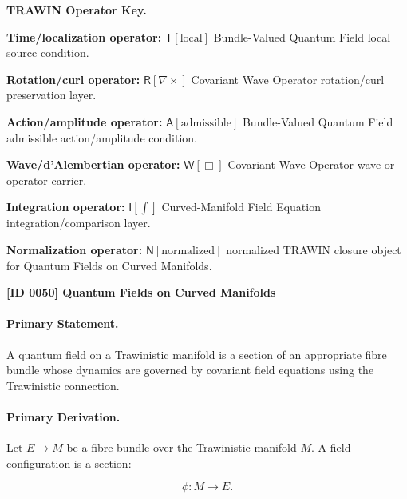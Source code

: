 \par\vspace{0.45\baselineskip}
\noindent\begin{minipage}[t]{\linewidth}
\begingroup
\small
\raggedright
\textbf{TRAWIN Operator Key.}\par
\noindent\textbf{Time/localization operator:} $\mathsf{T}\!\left[\mathrm{local}\right]$ Bundle-Valued Quantum Field local source condition.\par
\noindent\textbf{Rotation/curl operator:} $\mathsf{R}\!\left[\nabla\times\right]$ Covariant Wave Operator rotation/curl preservation layer.\par
\noindent\textbf{Action/amplitude operator:} $\mathsf{A}\!\left[\mathrm{admissible}\right]$ Bundle-Valued Quantum Field admissible action/amplitude condition.\par
\noindent\textbf{Wave/d'Alembertian operator:} $\mathsf{W}\!\left[\Box\right]$ Covariant Wave Operator wave or operator carrier.\par
\noindent\textbf{Integration operator:} $\mathsf{I}\!\left[\int\right]$ Curved-Manifold Field Equation integration/comparison layer.\par
\noindent\textbf{Normalization operator:} $\mathsf{N}\!\left[\mathrm{normalized}\right]$ normalized TRAWIN closure object for Quantum Fields on Curved Manifolds.\par
\endgroup
\end{minipage}

\clearpage
\noindent\textbf{[ID 0050] Quantum Fields on Curved Manifolds}\par
\vspace{0.35em}
\paragraph{Primary Statement.}
A quantum field on a Trawinistic manifold is a section of an appropriate fibre bundle whose dynamics are governed by covariant field equations using the Trawinistic connection.

\paragraph{Primary Derivation.}
Let $E\to M$ be a fibre bundle over the Trawinistic manifold $M$.  
A field configuration is a section:

\begin{equation}
\phi:M\to E .
\end{equation}

